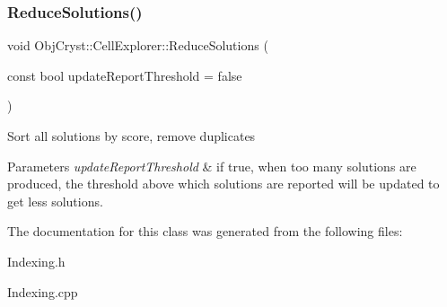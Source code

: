 \subsubsection{\texorpdfstring{ReduceSolutions()}{ReduceSolutions()}}
{\footnotesize\ttfamily void Obj\+Cryst\+::\+Cell\+Explorer\+::\+Reduce\+Solutions (\begin{DoxyParamCaption}\item[{const bool}]{update\+Report\+Threshold = {\ttfamily false} }\end{DoxyParamCaption})}

Sort all solutions by score, remove duplicates


\begin{DoxyParams}{Parameters}
{\em update\+Report\+Threshold} & if true, when too many solutions are produced, the threshold above which solutions are reported will be updated to get less solutions. \\
\hline
\end{DoxyParams}


The documentation for this class was generated from the following files\+:\begin{DoxyCompactItemize}
\item 
Indexing.\+h\item 
Indexing.\+cpp\end{DoxyCompactItemize}
